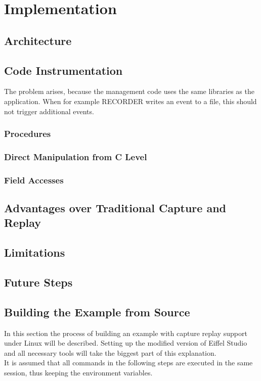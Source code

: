
\chapter{Implementation}
\section{Architecture}
\section{Code Instrumentation}

The problem arises, because the management code uses the same libraries as the application. When for example RECORDER writes an event to a file, this should not trigger additional events.  

\subsection{Procedures}
\subsection{Direct Manipulation from C Level}
\subsection{Field Accesses}
\section{Advantages over Traditional Capture and Replay}
\section{Limitations}
\section{Future Steps}
\section{Building the Example from Source}
In this section the process of building an example with capture replay support under Linux will be described. Setting up the modified version of Eiffel Studio and all necessary tools will take the biggest part of this explanation.\\
It is assumed that all commands in the following steps are executed in the same session, thus keeping the environment variables.\\

